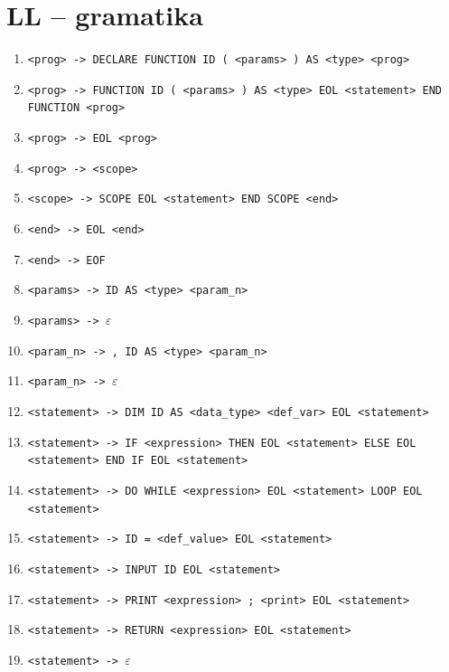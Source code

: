 \documentclass[a4paper, 11pt]{article}
\begin{document}
	\section{LL -- gramatika}
	\begin{table}[!ht]
		\centering
		\begin{enumerate}[noitemsep]
			\item \verb|<prog> -> DECLARE FUNCTION ID ( <params> ) AS <type> <prog>|
			\item \verb|<prog> -> FUNCTION ID ( <params> ) AS <type> EOL <statement> END| \newline \verb|FUNCTION <prog>|
			\item \verb|<prog> -> EOL <prog>|
			\item \verb|<prog> -> <scope>|

			\item \verb|<scope> -> SCOPE EOL <statement> END SCOPE <end>|
			\item \verb|<end> -> EOL <end>|
			\item \verb|<end> -> EOF|

			\item \verb|<params> -> ID AS <type> <param_n>|
			\item \verb|<params> -> |$\varepsilon$

			\item \verb|<param_n> -> , ID AS <type> <param_n>|
			\item \verb|<param_n> -> |$\varepsilon$

			\item \verb|<statement> -> DIM ID AS <data_type> <def_var> EOL <statement>|
			\item \verb|<statement> -> IF <expression> THEN EOL <statement> ELSE EOL| \newline \verb|<statement> END IF EOL <statement>|
			\item \verb|<statement> -> DO WHILE <expression> EOL <statement> LOOP EOL| \newline \verb|<statement>|
			\item \verb|<statement> -> ID = <def_value> EOL <statement>|
			\item \verb|<statement> -> INPUT ID EOL <statement>|
			\item \verb|<statement> -> PRINT <expression> ; <print> EOL <statement>|
			\item \verb|<statement> -> RETURN <expression> EOL <statement>|
			\item \verb|<statement> -> |$\varepsilon$


\end{enumerate}
\end{table}
\end{document}
